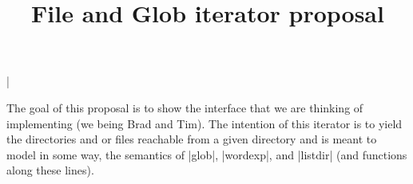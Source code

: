 \documentclass{article}
\title{File and Glob iterator proposal}
\begin{document}
\maketitle
\lstMakeShortInline[]|

The goal of this proposal is to show the interface that we are thinking of implementing
(we being Brad and Tim). The intention of this iterator is to yield the directories
and or files reachable from a given directory and is meant to model in some way,
the semantics of |glob|, |wordexp|, and |listdir| (and functions along these lines).


\end{document}
